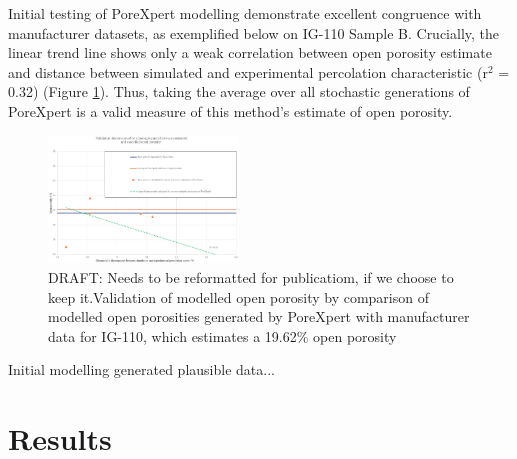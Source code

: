 \documentclass[3p,twocolumn]{elsarticle}
\begin{document}
    Initial testing of PoreXpert modelling demonstrate excellent congruence
    with manufacturer datasets, as exemplified below on IG-110 Sample B.
    Crucially, the linear trend line shows only a weak correlation between open
    porosity estimate and distance between simulated and experimental
    percolation characteristic (r\(^2\) = 0.32) (Figure
    \ref{fig:validationgraph}). Thus, taking the average over all stochastic
    generations of PoreXpert is a valid measure of this method's estimate of
    open porosity. 

\begin{figure}
    \centering
    \includegraphics[width=0.45\textwidth]{./Media/ValidationGraph.png}
    \caption{DRAFT: Needs to be reformatted for publicatiom, if we choose to keep it.Validation of modelled open porosity by comparison of modelled open porosities generated by PoreXpert with manufacturer data for IG-110, which estimates a 19.62\% open porosity \cite{Jones2018}}
    \label{fig:validationgraph}
\end{figure}

  Initial modelling generated plausible data...

\section{Results}

\begin{table}
  \centering
  \caption{Pore Size Distribution (PSD) and summary characteristics for IG-110 and IG-430 samples, tabulating number of pores, total pore area, and channel porosity.}
  \label{tab:PSDtable}
\end{table}
\end{document}
